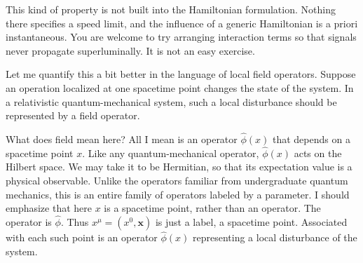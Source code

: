 This kind of property is not built into the Hamiltonian formulation. Nothing
there specifies a speed limit, and the influence of a generic Hamiltonian is a
priori instantaneous. You are welcome to try arranging interaction terms so
that signals never propagate superluminally. It is not an easy exercise.

Let me quantify this a bit better in the language of local field operators.
Suppose an operation localized at one spacetime point changes the state of the
system. In a relativistic quantum-mechanical system, such a local disturbance
should be represented by a field operator.

What does field mean here? All I mean is an operator $\hat\phi(x)$ that depends
on a spacetime point $x$. Like any quantum-mechanical operator, $\hat\phi(x)$
acts on the Hilbert space. We may take it to be Hermitian, so that its
expectation value is a physical observable.
Unlike the operators familiar from undergraduate quantum mechanics, this is an
entire family of operators labeled by a parameter. I should emphasize that here
$x$ is a spacetime point, rather than an operator. The operator is $\hat\phi$.
Thus $x^\mu=(x^0,\mathbf x)$ is just a label, a spacetime point. Associated with
each such point is an operator $\hat\phi(x)$ representing a local disturbance
of the system.

